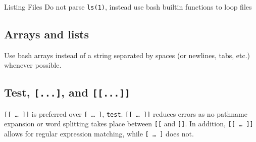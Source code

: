 \documentclass[
]{book}
\newenvironment{Shaded}{\begin{snugshade}}{\end{snugshade}}
\newcommand{\CommentTok}[1]{\textcolor[rgb]{0.56,0.35,0.01}{\textit{#1}}}
\newcommand{\ExtensionTok}[1]{#1}
\newcommand{\FunctionTok}[1]{\textcolor[rgb]{0.00,0.00,0.00}{#1}}
\newcommand{\KeywordTok}[1]{\textcolor[rgb]{0.13,0.29,0.53}{\textbf{#1}}}
\newcommand{\NormalTok}[1]{#1}
\newcommand{\StringTok}[1]{\textcolor[rgb]{0.31,0.60,0.02}{#1}}
\newcommand{\VariableTok}[1]{\textcolor[rgb]{0.00,0.00,0.00}{#1}}
\begin{document}
Listing Files
Do not parse \texttt{ls(1)}, instead use bash builtin functions to loop files

\begin{Shaded}
\end{Shaded}

\hypertarget{arrays-and-lists}{%
\subsection{Arrays and lists}\label{arrays-and-lists}}

Use bash arrays instead of a string separated by spaces (or newlines, tabs,
etc.) whenever possible.

\begin{Shaded}
\end{Shaded}

\hypertarget{test-...-and-...}{%
\subsection{\texorpdfstring{Test, \texttt{{[}...{]}}, and \texttt{{[}{[}...{]}{]}}}{Test, {[}...{]}, and {[}{[}...{]}{]}}}\label{test-...-and-...}}

\texttt{{[}{[}\ \ldots{}\ {]}{]}} is preferred over \texttt{{[}\ \ldots{}\ {]}}, \texttt{test}. \texttt{{[}{[}\ \ldots{}\ {]}{]}} reduces errors as no
pathname expansion or word splitting takes place between \texttt{{[}{[}} and \texttt{{]}{]}}.
In addition, \texttt{{[}{[}\ \ldots{}\ {]}{]}} allows for regular expression matching, while \texttt{{[}\ \ldots{}\ {]}}
does not.
\end{document}
